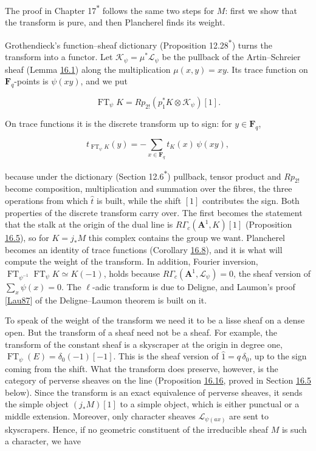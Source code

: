 \documentclass[11pt]{article}
\newcommand{\bpout}[1]{#1\textsuperscript{\hyperlink{bp-outside}{\ensuremath{\ast}}}}
\begin{document}
The proof in Chapter \bpout{17} follows the same two steps for \(M\): first we show that the transform is pure, and then Plancherel finds its weight.

Grothendieck's function–sheaf dictionary (Proposition \bpout{12.28}) turns the transform into a functor. Let \(\mathcal K_\psi=\mu^*\mathcal L_\psi\) be the pullback of the Artin–Schreier sheaf (Lemma \hyperref[bp5]{16.1}) along the multiplication \(\mu(x,y)=xy\). Its trace function on \(\mathbf F_q\)-points is \(\psi(xy)\), and we put

\[
\operatorname{FT}_\psi K=Rp_{2!}(p_1^*K\otimes\mathcal K_\psi)[1].
\]

On trace functions it is the discrete transform up to sign: for \(y\in\mathbf F_q\),

\[
t_{\operatorname{FT}_\psi K}(y)=-\sum_{x\in\mathbf F_q}t_K(x)\,\psi(xy),
\]

because under the dictionary (Section \bpout{12.6}) pullback, tensor product and \(Rp_{2!}\) become composition, multiplication and summation over the fibres, the three operations from which \(\hat t\) is built, while the shift \([1]\) contributes the sign. Both properties of the discrete transform carry over. The first becomes the statement that the stalk at the origin of the dual line is \(R\Gamma_c(\mathbf A^1,K)[1]\) (Proposition \hyperref[bp17]{16.5}), so for \(K=j_*M\) this complex contains the group we want. Plancherel becomes an identity of trace functions (Corollary \hyperref[bp26]{16.8}), and it is what will compute the weight of the transform. In addition, Fourier inversion, \(\operatorname{FT}_{\psi^{-1}}\operatorname{FT}_\psi K\simeq K(-1)\), holds because \(R\Gamma_c(\mathbf A^1,\mathcal L_\psi)=0\), the sheaf version of \(\sum_x\psi(x)=0\). The \(\ell\)-adic transform is due to Deligne, and Laumon's proof [\hyperref[bp57]{Lau87}] of the Deligne–Laumon theorem is built on it.

To speak of the weight of the transform we need it to be a lisse sheaf on a dense open. But the transform of a sheaf need not be a sheaf. For example, the transform of the constant sheaf is a skyscraper at the origin in degree one, \(\operatorname{FT}_\psi(E)=\delta_0(-1)[-1]\). This is the sheaf version of \(\hat1=q\,\delta_0\), up to the sign coming from the shift. What the transform does preserve, however, is the category of perverse sheaves on the line (Proposition \hyperref[bp48]{16.16}, proved in Section \hyperref[bp46]{16.5} below). Since the transform is an exact equivalence of perverse sheaves, it sends the simple object \((j_*M)[1]\) to a simple object, which is either punctual or a middle extension. Moreover, only character sheaves \(\mathcal L_{\psi(ax)}\) are sent to skyscrapers. Hence, if no geometric constituent of the irreducible sheaf \(M\) is such a character, we have
\end{document}

